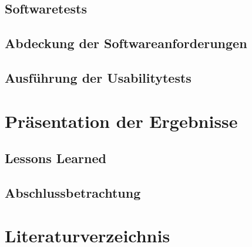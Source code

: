 \documentclass{scrreprt}
\begin{document}
\section{Softwaretests}
\section{Abdeckung der Softwareanforderungen}
\section{Ausführung der Usabilitytests}

\chapter{Präsentation der Ergebnisse}
\section{Lessons Learned}
\section{Abschlussbetrachtung}

\chapter{Literaturverzeichnis}
\nocite{*}
\printbibliography
\end{document}
